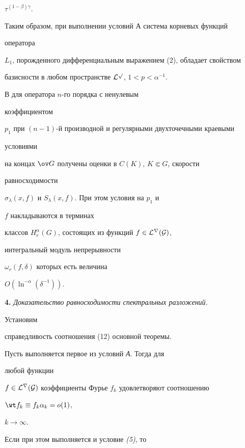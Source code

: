 {$\tau^{(1-\beta)\gamma}$.


Таким образом, при выполнении условий А система корневых функций


оператора


$L_1$, порожденного дифференциальным выражением (2), обладает свойством


базисности в любом пространстве $\cal L^p$, $1<p<\alpha^{-1}$.





\begin{note} В \cite{11} для оператора $n$-го порядка с ненулевым


коэффициентом


$p_1$ при $(n-1)$-й производной и регулярными двухточечными краевыми


условиями


на концах $\ov G$ получены оценки в $C(K)$, $K\Subset G$, скорости


равносходимости


$\sigma_\lambda(x,f)$ и $S_\lambda(x,f)$. При этом условия на $p_1$ и


$f$ накладываются в терминах


классов $H^\alpha_r(G)$, состоящих из функций $f\in\cal L^r(G)$,


интегральный модуль непрерывности


$\omega_r(f,\delta)$ которых есть величина


$O(\ln^{-\alpha}(\delta^{-1}))$.


\end{note}





{\bf 4.} {\it Доказательство равносходимости спектральных разложений.}


Установим


справедливость соотношения (12) основной теоремы.





\begin{lem} Пусть выполняется первое из условий {\em А}. Тогда для


любой функции


$f\in\cal L^r(G)$ коэффициенты Фурье $f_k$ удовлетворяют соотношению


$\wt f_k\equiv f_k\alpha_k=o(1)$,


$k\to\infty$.


Если при этом выполняется и условие {\em (5)}, то



\end{lem}}
